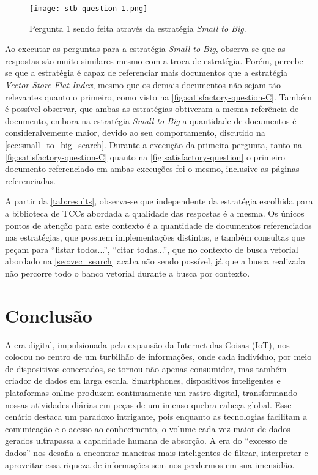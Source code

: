 \documentclass[a4paper, 12pt]{article}
\begin{document}
    \begin{figure}[ht]
        \texttt{[image: stb-question-1.png]}
        \centering
        \caption{Pergunta 1 sendo feita através da estratégia \textit{Small to Big}.}
        \centering
        \label{fig:satisfactory-question-C}
    \end{figure}
    
    Ao executar as perguntas para a estratégia \textit{Small to Big}, observa-se que as respostas são muito similares mesmo com a troca de estratégia. Porém, percebe-se que a estratégia é capaz de referenciar mais documentos que a estratégia \textit{Vector Store Flat Index}, mesmo que os demais documentos não sejam tão relevantes quanto o primeiro, como visto na \autoref{fig:satisfactory-question-C}. Também é possível observar, que ambas as estratégias obtiveram a mesma referência de documento, embora na estratégia \textit{Small to Big} a quantidade de documentos é consideralvemente maior, devido ao seu comportamento, discutido na \autoref{sec:small_to_big_search}. Durante a execução da primeira pergunta, tanto na \autoref{fig:satisfactory-question-C} quanto na \autoref{fig:satisfactory-question} o primeiro documento referenciado em ambas execuções foi o mesmo, inclusive as páginas referenciadas.

    A partir da \autoref{tab:results}, observa-se que independente da estratégia escolhida para a biblioteca de TCCs abordada a qualidade das respostas é a mesma. Os únicos pontos de atenção para este contexto é a quantidade de documentos referenciados nas estratégias, que possuem implementações distintas, e também consultas que peçam para ``listar todos...'', ``citar todas...'', que no contexto de busca vetorial abordado na \autoref{sec:vec_search} acaba não sendo possível, já que a busca realizada não percorre todo o banco vetorial durante a busca por contexto.
    
    \section{Conclusão}

    A era digital, impulsionada pela expansão da Internet das Coisas (IoT), nos colocou no centro de um turbilhão de informações, onde cada indivíduo, por meio de dispositivos conectados, se tornou não apenas consumidor, mas também criador de dados em larga escala. Smartphones, dispositivos inteligentes e plataformas online produzem continuamente um rastro digital, transformando nossas atividades diárias em peças de um imenso quebra-cabeça global. Esse cenário destaca um paradoxo intrigante, pois enquanto as tecnologias facilitam a comunicação e o acesso ao conhecimento, o volume cada vez maior de dados gerados ultrapassa a capacidade humana de absorção. A era do ``excesso de dados'' nos desafia a encontrar maneiras mais inteligentes de filtrar, interpretar e aproveitar essa riqueza de informações sem nos perdermos em sua imensidão.
\end{document}
